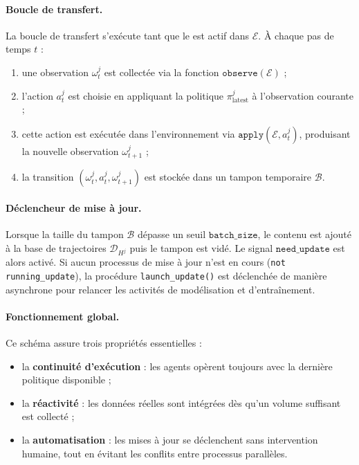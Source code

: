 \paragraph{Boucle de transfert.}
La boucle de transfert s’exécute tant que le  est actif dans $\mathcal{E}$.
À chaque pas de temps $t$ :
\begin{enumerate}
    \item une observation $\omega^j_t$ est collectée via la fonction $\texttt{observe}(\mathcal{E})$ ;
    \item l’action $a^j_t$ est choisie en appliquant la politique $\pi^j_{\text{latest}}$ à l’observation courante ;
    \item cette action est exécutée dans l’environnement via $\texttt{apply}(\mathcal{E}, a^j_t)$, produisant la nouvelle observation $\omega^j_{t+1}$ ;
    \item la transition $(\omega^j_t, a^j_t, \omega^j_{t+1})$ est stockée dans un tampon temporaire $\mathcal{B}$.
\end{enumerate}

\paragraph{Déclencheur de mise à jour.}
Lorsque la taille du tampon $\mathcal{B}$ dépasse un seuil $\texttt{batch\_size}$, le contenu est ajouté à la base de trajectoires $\mathcal{D}_{H^j}$ puis le tampon est vidé.
Le signal $\texttt{need\_update}$ est alors activé.
Si aucun processus de mise à jour n’est en cours (\texttt{not running\_update}), la procédure \texttt{launch\_update()} est déclenchée de manière asynchrone pour relancer les activités de modélisation et d’entraînement.

\paragraph{Fonctionnement global.}
Ce schéma assure trois propriétés essentielles :
\begin{itemize}
    \item la \textbf{continuité d’exécution} : les agents opèrent toujours avec la dernière politique disponible ;
    \item la \textbf{réactivité} : les données réelles sont intégrées dès qu’un volume suffisant est collecté ;
    \item la \textbf{automatisation} : les mises à jour se déclenchent sans intervention humaine, tout en évitant les conflits entre processus parallèles.
\end{itemize}

